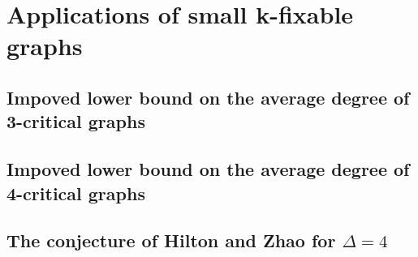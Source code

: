 \documentclass[12pt]{article}
\theoremstyle{plain}
\theoremstyle{definition}
\theoremstyle{remark}
\begin{document}
\section{Applications of small k-fixable graphs}
\subsection{Impoved lower bound on the average degree of 3-critical graphs}
\subsection{Impoved lower bound on the average degree of 4-critical graphs}
\subsection{The conjecture of Hilton and Zhao for $\Delta=4$}
\end{document}
